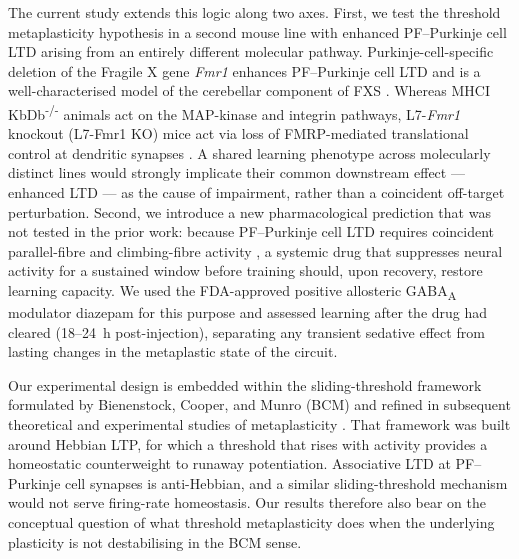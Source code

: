 \documentclass[11pt]{article}
\begin{document}
The current study extends this logic along two axes. First, we test the
threshold metaplasticity hypothesis in a second mouse line with enhanced
PF--Purkinje cell LTD arising from an entirely different molecular pathway.
Purkinje-cell-specific deletion of the Fragile X gene \textit{Fmr1} enhances
PF--Purkinje cell LTD and is a well-characterised model of the cerebellar
component of FXS \citep{koekkoek2005fmr1, mientjes2006conditional,
zhang2004l7cre, nosyreva2006fmr1}. Whereas MHCI KbDb\textsuperscript{-/-}
animals act on the MAP-kinase and integrin pathways, L7-\textit{Fmr1}
knockout (L7-Fmr1 KO) mice act via loss of FMRP-mediated translational
control at dendritic synapses \citep{koekkoek2005fmr1, nosyreva2006fmr1}.
A shared learning phenotype across molecularly distinct lines would strongly
implicate their common downstream effect --- enhanced LTD --- as the cause
of impairment, rather than a coincident off-target perturbation. Second,
we introduce a new pharmacological prediction that was not tested in the
prior work: because PF--Purkinje cell LTD requires coincident parallel-fibre
and climbing-fibre activity \citep{levram2003reversing}, a systemic drug
that suppresses neural activity for a sustained window before training
should, upon recovery, restore learning capacity. We used the
FDA-approved positive allosteric GABA\textsubscript{A} modulator diazepam
for this purpose and assessed learning after the drug had cleared
(18--24~h post-injection), separating any transient sedative effect from
lasting changes in the metaplastic state of the circuit.

Our experimental design is embedded within the sliding-threshold framework
formulated by Bienenstock, Cooper, and Munro (BCM) and refined in
subsequent theoretical and experimental studies of metaplasticity
\citep{abraham1996metaplasticity}. That framework was built around Hebbian
LTP, for which a threshold that rises with activity provides a homeostatic
counterweight to runaway potentiation. Associative LTD at PF--Purkinje
cell synapses is anti-Hebbian, and a similar sliding-threshold mechanism
would not serve firing-rate homeostasis. Our results therefore also bear
on the conceptual question of what threshold metaplasticity does when the
underlying plasticity is not destabilising in the BCM sense.
\end{document}
